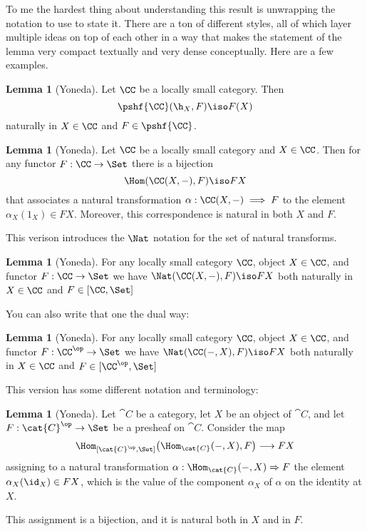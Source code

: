 \documentclass[12pt]{article}
\theoremstyle{definition}
\newtheorem{lemma}[thm]{Lemma}
\theoremstyle{definition}
\theoremstyle{definition}
\numberwithin{equation}{section}
\begin{document}
To me the hardest thing about understanding this result is unwrapping the notation to use to state it.
There are a ton of different styles, all of which layer multiple ideas on top of each other in a way that
makes the statement of the lemma very compact textually and very dense conceptually. Here are a few examples.

\newpage

\begin{lemma}[Yoneda]   
\label{yoneda1}
Let $\CC$ be a locally small category.  Then
% 
\begin{equation}        
\label{eq:yoneda}
\pshf{\CC}(\h_X, F)
\iso
F(X)
\end{equation}
% 
naturally in $X \in \CC$ and $F \in \pshf{\CC}$.  
\end{lemma}

\begin{lemma}[Yoneda]\label{yoneda2} Let $\CC$ be a locally small category and $X \in
\CC$. Then for any functor $F : \CC \to \Set$ there is a bijection
$$
\Hom(\CC(X,-), F) \iso FX
$$
that associates a natural transformation $\alpha:\CC(X,-) \implies F$ to the element
$\alpha_X(1_X) \in FX$. Moreover, this correspondence is natural in both $X$ and $F$.
\end{lemma}

\noindent This verison introduces the $\Nat$ notation for the set of natural transforms.

\begin{lemma}[Yoneda]\label{yoneda3} For any locally small category $\CC$, object $X
\in \CC$, and functor $F:\CC \to \Set$ we have  $\Nat(\CC(X,-),F) \iso FX$
both naturally in $X \in \CC$ and $F \in [\CC, \Set]$
\end{lemma}

\noindent You can also write that one the dual way:
\begin{lemma}[Yoneda]\label{yoneda4} For any locally small category $\CC$, object
$X \in \CC$, and functor $F:\CC^{\op} \to \Set$ we have  $\Nat(\CC(-,X),F)
\iso FX$ both naturally in $X \in \CC$ and $F \in [\CC^{\op}, \Set]$
\end{lemma}

\noindent
This version has some different notation and terminology:

\begin{lemma}[Yoneda]\label{yoneda5}
 Let $\cat{C}$ be a category, let $X$ be an object of $\cat{C}$, and let $F:\cat{C}^\op\to\Set$ be a presheaf on $\cat{C}$. 
 Consider the map 
 $$
 \Hom_{[\cat{C}^\op,\Set]} \big( \Hom_\cat{C} (-,X) , F \big) \longrightarrow FX
 $$
 assigning to a natural transformation $\alpha:\Hom_\cat{C} (-,X)\Rightarrow F$ the element $\alpha_X(\id_X)\in FX$, which is the value of the component $\alpha_X$ of $\alpha$ on the identity at $X$. 

 This assignment is a bijection, and it is natural both in $X$ and in $F$.
\end{lemma}
\end{document}
